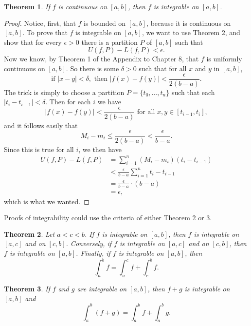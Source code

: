 \documentclass{article}
\newtheorem{theorem}{Theorem}
\begin{document}
\begin{theorem}
  If $f$ is continuous on $[a, b]$, then $f$ is integrable on $[a, b]$.
\end{theorem}
\begin{proof}
  Notice, first, that $f$ is bounded on $[a, b]$, because it is continuous on
  $[a, b]$. To prove that $f$ is integrable on $[a, b]$, we want to use Theorem
  2, and show that for every $\epsilon > 0$ there is a partition $P$ of $[a,
  b]$ such that \[
    U(f, P) - L(f, P) < \epsilon.
  \] Now we know, by Theorem 1 of the Appendix to Chapter 8, that $f$ is
  uniformly continuous on $[a, b]$. So there is some $\delta > 0$ such that for
  all $x$ and $y$ in $[a, b]$, \[
    \text{if } |x - y| < \delta,
    \text{ then } |f(x) - f(y)| < \frac{\epsilon}{2(b - a)}.
  \] The trick is simply to choose a partition $P = \{t_0, \ldots, t_n\}$ such
  that each $|t_i - t_{i - 1}| < \delta$. Then for each $i$ we have \[
    |f(x) - f(y)|
    < \frac{\epsilon}{2(b - a)} \text{ for all } x, y \in [t_{i - 1}, t_i],
    \] and it follows easily that \[
    M_i - m_i \leq \frac{\epsilon}{2(b - a)} < \frac{\epsilon}{b - a}.
  \] Since this is true for all $i$, we then have
  \begin{align*}
    U(f, P) - L(f, P)
    &= \sum_{i = 1}^n (M_i - m_i)(t_i - t_{i - 1}) \\
    &< \frac{\epsilon}{b - a}\sum_{i = 1}^n t_i - t_{i - 1} \\
    &= \frac{\epsilon}{b - a} \cdot (b - a) \\
    &= \epsilon,
  \end{align*}
  which is what we wanted.
\end{proof}

Proofs of integrability could use the criteria of either Theorem 2 or 3.

\begin{theorem}
  Let $a < c < b$. If $f$ is integrable on $[a, b]$, then $f$ is integrable on
  $[a, c]$ and on $[c, b]$. Conversely, if $f$ is integrable on $[a, c]$ and on
  $[c, b]$, then $f$ is integrable on $[a, b]$. Finally, if $f$ is integrable
  on $[a, b]$, then \[
    \int_a^b f = \int_a^c f + \int_c^b f.
  \]
\end{theorem}

\begin{theorem}
  If $f$ and $g$ are integrable on $[a, b]$, then $f + g$ is integrable on $[a,
  b]$ and \[
    \int_a^b (f + g) = \int_a^b f + \int_a^b g.
  \]
\end{theorem}
\end{document}
